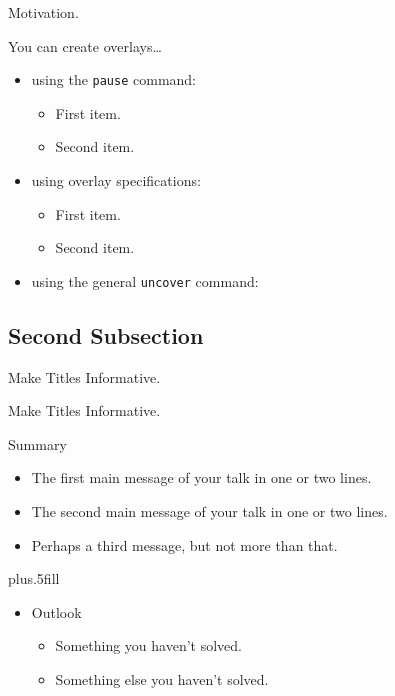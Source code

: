 \documentclass{beamer}
\begin{document}
\begin{frame}{Motivation.}

  You can create overlays\dots
  \begin{itemize}
  \item using the \texttt{pause} command:
    \begin{itemize}
    \item
      First item.
      \pause
    \item
      Second item.
    \end{itemize}
  \item
    using overlay specifications:
    \begin{itemize}
    \item<3->
      First item.
    \item<4->
      Second item.
    \end{itemize}
  \item
    using the general \texttt{uncover} command:
    \begin{itemize}
    \end{itemize}
  \end{itemize}
\end{frame}

\subsection{Second Subsection}

\begin{frame}{Make Titles Informative.}
\end{frame}

\begin{frame}{Make Titles Informative.}
\end{frame}



\begin{frame}{Summary}
  \begin{itemize}
  \item
    The \alert{first main message} of your talk in one or two lines.
  \item
    The \alert{second main message} of your talk in one or two lines.
  \item
    Perhaps a \alert{third message}, but not more than that.
  \end{itemize}

  \vskip0pt plus.5fill
  \begin{itemize}
  \item
    Outlook
    \begin{itemize}
    \item
      Something you haven't solved.
    \item
      Something else you haven't solved.
    \end{itemize}
  \end{itemize}
\end{frame}
\end{document}
